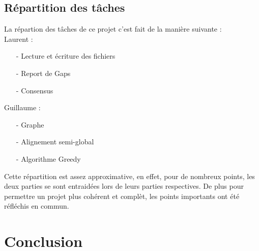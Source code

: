 \documentclass[a4paper, 12pt]{article}
\begin{document}
	
	\subsection{Répartition des tâches}
	
	La répartion des tâches de ce projet c'est fait de la manière suivante :\\
	Laurent : \begin{itemize}
		\item[-] Lecture et écriture des fichiers
		\item[-] Report de Gaps
		\item[-] Consensus
	\end{itemize}
	Guillaume : \begin{itemize}
		\item[-] Graphe
		\item[-] Alignement semi-global
		\item[-] Algorithme Greedy
	\end{itemize}
	Cette répartition est assez approximative, en effet, pour de nombreux points, les deux parties se sont entraidées lors de leurs parties respectives. De plus pour permettre un projet plus cohérent et complèt, les points importants ont été réfléchis en commun.
\section{Conclusion}
\end{document}
